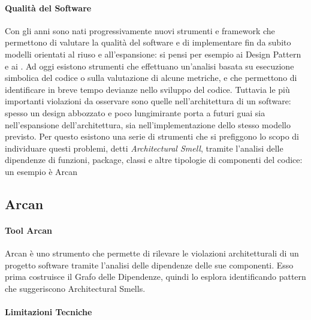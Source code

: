 \paragraph{Qualit\`a del Software}

Con gli anni sono nati progressivamente nuovi strumenti e framework che permettono di valutare la qualit\`a del software e di implementare fin da subito modelli orientati al riuso e all'espansione: si pensi per esempio ai Design Pattern \cite{gamma1995design} e ai \cite{fowler1999refactoring}. Ad oggi esistono strumenti che effettuano un'analisi basata su esecuzione simbolica del codice o sulla valutazione di alcune metriche, e che permettono di identificare in breve tempo devianze nello sviluppo del codice. Tuttavia le pi\`u importanti violazioni da osservare sono quelle nell'architettura di un software: spesso un design abbozzato e poco lungimirante porta a futuri guai sia nell'espansione dell'architettura, sia nell'implementazione dello stesso modello previsto. Per questo esistono una serie di strumenti che si prefiggono lo scopo di individuare questi problemi, detti \emph{Architectural Smell}, tramite l'analisi delle dipendenze di funzioni, package, classi e altre tipologie di componenti del codice: un esempio \`e Arcan \cite{Arcan}

\subsection{Arcan}

\paragraph{Tool Arcan}

Arcan \`e uno strumento che permette di rilevare le violazioni architetturali di un progetto software tramite l'analisi delle dipendenze delle sue componenti. Esso prima costruisce il Grafo delle Dipendenze, quindi lo esplora identificando pattern che suggeriscono Architectural Smells.



\paragraph{Limitazioni Tecniche}


